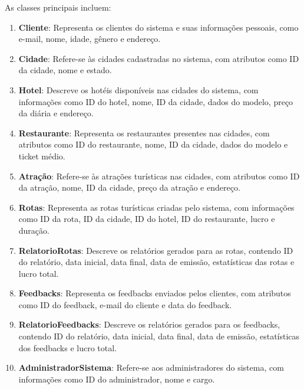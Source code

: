 As classes principais incluem:
\begin{enumerate}
    \item \textbf{Cliente}: Representa os clientes do sistema e suas informações pessoais, como e-mail, nome, idade, gênero e endereço.
    \item \textbf{Cidade}: Refere-se às cidades cadastradas no sistema, com atributos como ID da cidade, nome e estado.
    \item \textbf{Hotel}: Descreve os hotéis disponíveis nas cidades do sistema, com informações como ID do hotel, nome, ID da cidade, dados do modelo, preço da diária e endereço.
    \item \textbf{Restaurante}: Representa os restaurantes presentes nas cidades, com atributos como ID do restaurante, nome, ID da cidade, dados do modelo e ticket médio.
    \item \textbf{Atração}: Refere-se às atrações turísticas nas cidades, com atributos como ID da atração, nome, ID da cidade, preço da atração e endereço.
    \item \textbf{Rotas}: Representa as rotas turísticas criadas pelo sistema, com informações como ID da rota, ID da cidade, ID do hotel, ID do restaurante, lucro e duração.
    \item \textbf{RelatorioRotas}: Descreve os relatórios gerados para as rotas, contendo ID do relatório, data inicial, data final, data de emissão, estatísticas das rotas e lucro total.
    \item \textbf{Feedbacks}: Representa os feedbacks enviados pelos clientes, com atributos como ID do feedback, e-mail do cliente e data do feedback.
    \item \textbf{RelatorioFeedbacks}: Descreve os relatórios gerados para os feedbacks, contendo ID do relatório, data inicial, data final, data de emissão, estatísticas dos feedbacks e lucro total.
    \item \textbf{AdministradorSistema}: Refere-se aos administradores do sistema, com informações como ID do administrador, nome e cargo.
\end{enumerate}

